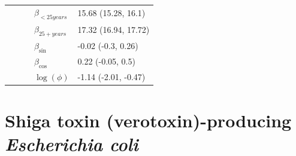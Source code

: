 \documentclass[a4paper,twoside,11pt]{report} %
\theoremstyle{definition}
\theoremstyle{definition}
\theoremstyle{definition}
\theoremstyle{definition}
\theoremstyle{remark}
\begin{document}
\begin{longtable}[t]{llrll}
\hspace{1em}\hspace{1em} &  &  & $\beta_{<25 years}$ & 15.68 (15.28, 16.1)\\

\hspace{1em}\hspace{1em} &  &  & $\beta_{25+ years}$ & 17.32 (16.94, 17.72)\\

\hspace{1em}\hspace{1em} &  &  & $\beta_{\sin}$ & -0.02 (-0.3, 0.26)\\

\hspace{1em}\hspace{1em} &  &  & $\beta_{\cos}$ & 0.22 (-0.05, 0.5)\\

\hspace{1em}\hspace{1em} &  &  & $\log(\phi)$ & -1.14 (-2.01, -0.47)\\*
\end{longtable}

\section{Shiga toxin (verotoxin)-producing \textit{Escherichia coli}}
\end{document}
